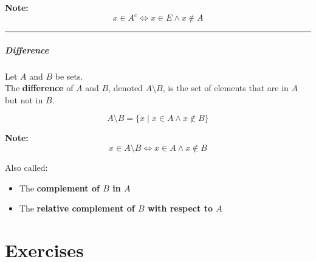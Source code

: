 \documentclass[
]{book}
\providecommand{\tightlist}{%
  \setlength{\itemsep}{0pt}\setlength{\parskip}{0pt}}
\theoremstyle{definition}
\theoremstyle{definition}
\theoremstyle{definition}
\theoremstyle{definition}
\theoremstyle{remark}
\begin{document}
\textbf{Note:}\\
\[
x \in A^c \iff x \in E \land x \notin A
\]

\begin{center}\rule{0.5\linewidth}{0.5pt}\end{center}

\paragraph{\texorpdfstring{\textbf{Difference}}{Difference}}\label{difference}

Let \(A\) and \(B\) be sets.\\
The \textbf{difference} of \(A\) and \(B\), denoted \(A \setminus B\), is the set of elements that are in \(A\) but not in \(B\).

\[
A \setminus B = \{ x \mid x \in A \land x \notin B \}
\]

\textbf{Note:}\\
\[
x \in A \setminus B \iff x \in A \land x \notin B
\]

Also called:

\begin{itemize}
\tightlist
\item
  The \textbf{complement of \(B\) in \(A\)}
\item
  The \textbf{relative complement of \(B\) with respect to \(A\)}
\end{itemize}

\chapter{Exercises}\label{exercises-1}
\end{document}
